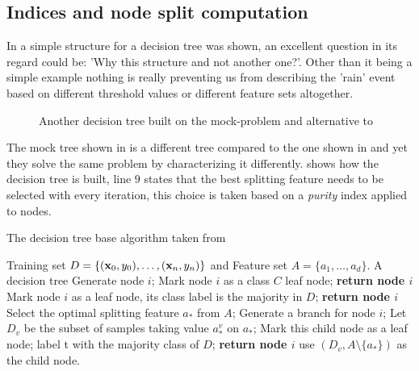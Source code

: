 \subsection{Indices and node split computation}
In  a simple structure for a decision tree was shown, an excellent question in
its regard could be: 'Why this structure and not another one?'. Other than it being a simple example
nothing is really preventing us from describing the 'rain' event based on different threshold values
or different feature sets altogether.
\begin{figure}
	\centering
	\caption{Another decision tree built on the mock-problem and alternative to
		}
	\label{fig:simple-dt-alt}
\end{figure}
The mock tree shown in  is a different tree compared to the one shown in
 and yet they solve the same problem by characterizing it differently.
 shows how the decision tree is built, line $9$ states that the best
splitting feature needs to be selected with every iteration, this choice is taken based on a
\emph{purity} index applied to nodes.

\begin{algorithm}
	\caption{The decision tree base algorithm taken from
		\cite{ZhouZhi-Hua2021ML}}\label{algo:decision-tree}
	\begin{algorithmic}[1]
		\Require Training set $D = \{(\mathbf{x}_0, y_0), \ldots, (\mathbf{x}_n, y_n)\}$ and Feature set $A = \{a_1, \ldots,
			a_d\}$.
		\Ensure A decision tree
		\State Generate node $i$;
		\State Mark node $i$ as a class $C$ leaf node; \textbf{return node $i$}
		\EndIf
		\State Mark node $i$ as a leaf node, its class label is
		the majority in $D$;
		\State \textbf{return node $i$}
		\EndIf
		\State Select the optimal splitting feature $a_*$ from $A$;
		\State Generate a branch for node $i$;
		\State Let $D_v$ be the subset of samples taking value $a_*^v$ on $a_*$;
		\State Mark this child node as a leaf node;
		\State label t with the majority class of $D$;
		\textbf{return node $i$}
		\Else
		\State use $(D_v, A \setminus \{a_*\})$ as the child node.
		\EndIf
		\EndFor
		\EndFunction
	\end{algorithmic}
\end{algorithm}

